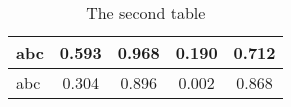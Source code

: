 \begin{longtable}{l|SSSS}
\caption{The second table}\label{}\\
\toprule

abc	&0.593	&0.968	&0.190	&0.712	\\\hline
abc	&0.304	&0.896	&0.002	&0.868	\\
\bottomrule
\end{longtable}